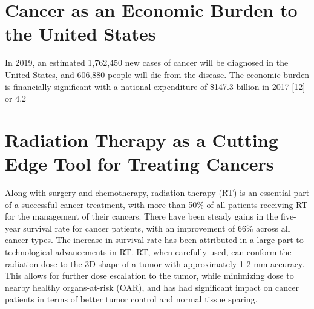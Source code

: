 \documentclass[12pt,a4paper]{article}
\begin{document}
 

\section{Cancer as an Economic Burden to the United States}
In 2019, an estimated 1,762,450 new cases of cancer will be diagnosed in the United States, and 606,880 people will die from the disease. The economic burden is financially significant with a national expenditure of \$147.3 billion in 2017 [12] or 4.2%

\section{Radiation Therapy as a Cutting Edge Tool for Treating Cancers}
Along with surgery and chemotherapy, radiation therapy (RT) is an essential part of a successful cancer treatment, with more than 50\% of all patients receiving RT for the management of their cancers. There have been steady gains in the five-year survival rate for cancer patients, with an improvement of 66\% across all cancer types. The increase in survival rate has been attributed in a large part to technological advancements in RT. RT, when carefully used, can conform the radiation dose to the 3D shape of a tumor with approximately 1-2 mm accuracy. This allows for further dose escalation to the tumor, while minimizing dose to nearby healthy organs-at-risk (OAR), and has had significant impact on cancer patients in terms of better tumor control and normal tissue sparing.
\end{document}

